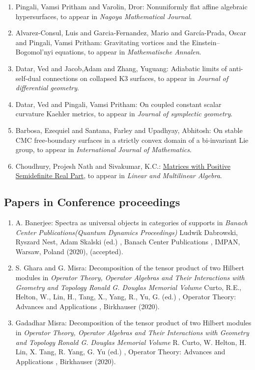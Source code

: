 \begin{enumerate}
\item Pingali, Vamsi Pritham and Varolin, Dror: Nonuniformly flat affine algebraic hypersurfaces, to appear in \emph{Nagoya Mathematical Journal}.
\item Alvarez-Consul, Luis and Garcia-Fernandez, Mario  and García-Prada, Oscar and Pingali, Vamsi Pritham: Gravitating vortices and the Einstein–Bogomol’nyi equations, to appear in \emph{Mathematische Annalen}.
\item Datar, Ved and Jacob,Adam and Zhang, Yuguang: Adiabatic limits of anti-self-dual connections on collapsed K3 surfaces, to appear in \emph{Journal of differential geometry}.
\item Datar, Ved and Pingali, Vamsi Pritham: On coupled constant scalar curvature Kaehler metrics, to appear in \emph{Journal of symplectic geometry}.
\item Barbosa, Ezequiel and Santana, Farley and Upadhyay, Abhitosh: On stable CMC free-boundary surfaces in a strictly convex domain of a bi-invariant Lie group, to appear in \emph{International Journal of Mathematics}.
\item Choudhury, Projesh Nath and Sivakumar, K.C.: \href{https://doi.org/10.1080/03081087.2019.1602588}{Matrices with Positive Semidefinite Real Part}, to appear in \emph{Linear and Multilinear Algebra}.
\end{enumerate}


\subsection{Papers in Conference proceedings}

\begin{enumerate}
\item A. Banerjee: Spectra as universal objects in categories of supports in {\em Banach Center Publications(Quantum Dynamics Proceedings)} Ludwik Dabrowski, Ryszard Nest, Adam Skalski (ed.) , Banach Center Publications , IMPAN, Warsaw, Poland (2020), (accepted).
\item S. Ghara and G. Misra: Decomposition of the tensor product of two Hilbert modules in {\em Operator Theory, Operator Algebras and Their Interactions with Geometry and Topology Ronald G. Douglas Memorial Volume} Curto, R.E., Helton, W., Lin, H., Tang, X., Yang, R., Yu, G. (ed.) , Operator Theory: Advances and Applications , Birkhauser (2020).
\item Gadadhar Misra: Decomposition of the tensor product of two Hilbert modules in {\em Operator Theory, Operator Algebras and Their Interactions with Geometry and Topology Ronald G. Douglas Memorial Volume} R. Curto, W. Helton, H. Lin, X. Tang, R. Yang, G. Yu (ed.) , Operator Theory: Advances and Applications , Birkhauser (2020).
\end{enumerate}


